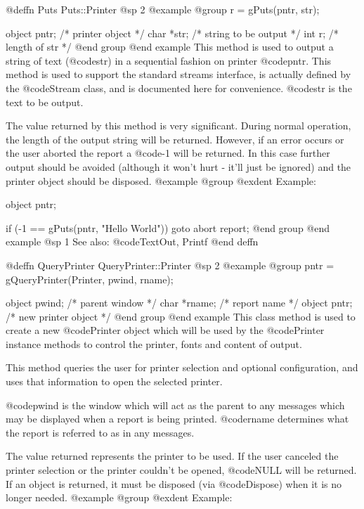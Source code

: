 @deffn {Puts} Puts::Printer
@sp 2
@example
@group
r = gPuts(pntr, str);

object   pntr;  /*  printer object        */
char    *str;   /*  string to be output   */
int      r;     /*  length of str         */
@end group
@end example
This method is used to output a string of text (@code{str}) in a sequential
fashion on printer @code{pntr}.  This method is used to support the standard
streams interface, is actually defined by the @code{Stream} class, and
is documented here for convenience. @code{str} is the text to be output. 

The value returned by this method is very significant.  During normal
operation, the length of the output string will be returned.  However,
if an error occurs or the user aborted the report a @code{-1} will be
returned.  In this case further output should be avoided (although it
won't hurt - it'll just be ignored) and the printer object should be
disposed.
@example
@group
@exdent Example:

object  pntr;

if (-1 == gPuts(pntr, "Hello World\n"))
        goto abort report;
@end group
@end example
@sp 1
See also:  @code{TextOut, Printf}
@end deffn











@deffn {QueryPrinter} QueryPrinter::Printer
@sp 2
@example
@group
pntr = gQueryPrinter(Printer, pwind, rname); 

object  pwind;  /*  parent window       */
char    *rname; /*  report name         */
object  pntr;   /*  new printer object  */
@end group
@end example
This class method is used to create a new @code{Printer} object which
will be used by the @code{Printer} instance methods to control the
printer, fonts and content of output.

This method queries the user for printer selection and optional
configuration, and uses that information to open the selected
printer.

@code{pwind} is the window which will act as the parent to any
messages which may be displayed when a report is being printed.
@code{rname} determines what the report is referred to as in any
messages.

The value returned represents the printer to be used.  If the user
canceled the printer selection or the printer couldn't be opened,
@code{NULL} will be returned. If an object is returned, it must be
disposed (via @code{Dispose}) when it is no longer needed.
@example
@group
@exdent Example:

